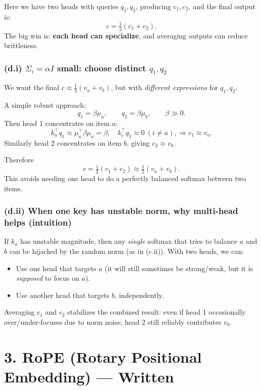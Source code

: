 \documentclass[11pt]{article}
\begin{document}
Here we have two heads with queries $q_1,q_2$, producing $c_1,c_2$, and the final output is:
\[
c=\tfrac12(c_1+c_2).
\]
The big win is: \textbf{each head can specialize}, and averaging outputs can reduce brittleness.

\subsubsection*{(d.i) $\Sigma_i=\alpha I$ small: choose distinct $q_1,q_2$}

We want the final $c\approx \tfrac12(v_a+v_b)$, but with \emph{different expressions} for $q_1,q_2$.

A simple robust approach:
\[
q_1 = \beta \mu_a,\qquad q_2 = \beta \mu_b,\qquad \beta\gg 0.
\]
Then head 1 concentrates on item $a$:
\[
k_a^\top q_1 \approx \mu_a^\top \beta\mu_a=\beta,
\quad
k_i^\top q_1 \approx 0 \ (i\neq a),
\Rightarrow c_1\approx v_a.
\]
Similarly head 2 concentrates on item $b$, giving $c_2\approx v_b$.

Therefore
\[
c=\tfrac12(c_1+c_2)\approx \tfrac12(v_a+v_b).
\]
This avoids needing one head to do a perfectly balanced softmax between two items.

\subsubsection*{(d.ii) When one key has unstable norm, why multi-head helps (intuition)}

If $k_a$ has unstable magnitude, then any \emph{single} softmax that tries to balance $a$ and $b$ can be hijacked by the random norm (as in (c.ii)). With two heads, we can:
\begin{itemize}[leftmargin=18pt]
  \item Use one head that targets $a$ (it will still sometimes be strong/weak, but it is \emph{supposed} to focus on $a$).
  \item Use another head that targets $b$, independently.
\end{itemize}
Averaging $c_1$ and $c_2$ stabilizes the combined result: even if head 1 occasionally over/under-focuses due to norm noise, head 2 still reliably contributes $v_b$.

\section*{3. RoPE (Rotary Positional Embedding) --- Written}
\end{document}

